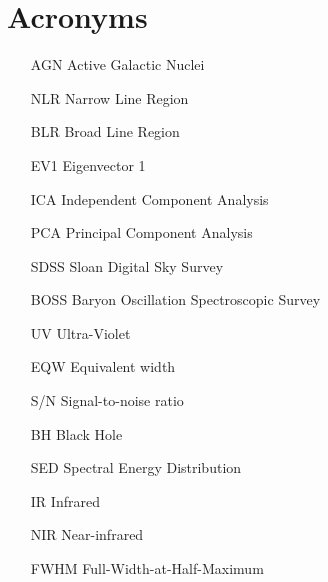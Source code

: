     \chapter*{Acronyms}
    \begin{itemize}
        \item[AGN]{Active Galactic Nuclei}
        \item[NLR]{Narrow Line Region}
        \item[BLR]{Broad Line Region}
        \item[EV1]{Eigenvector 1}
        \item[ICA]{Independent Component Analysis}
        \item[PCA]{Principal Component Analysis}
        \item[SDSS]{Sloan Digital Sky Survey}
        \item[BOSS]{Baryon Oscillation Spectroscopic Survey}
        \item[UV]{Ultra-Violet}
        \item[EQW]{Equivalent width}
        \item[S/N]{Signal-to-noise ratio}
        \item[BH]{Black Hole}
        \item[SED]{Spectral Energy Distribution}
        \item[IR]{Infrared}
        \item[NIR]{Near-infrared}
        \item[FWHM]{Full-Width-at-Half-Maximum}
    \end{itemize}     

          
\endgroup
